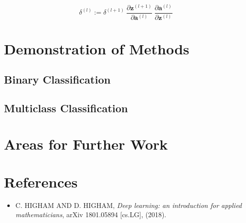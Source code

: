 \documentclass{article}
\begin{document}
        
        
        $$
        \delta^{(l)} :=
            \delta^{(l+1)} \
            \frac{\partial \mathbf{z}^{(l+1)}}{\partial \mathbf{a}^{(l)}} \
            \frac{\partial \mathbf{a}^{(l)}}{\partial \mathbf{z}^{(l)}} \
        $$
        
        
        
        
        
        






\section{Demonstration of Methods}

    \subsection{Binary Classification}
    
    \subsection{Multiclass Classification}
    



\section{Areas for Further Work}    




\section*{References}

	\begin{itemize}
	
		\item[] C. HIGHAM AND D. HIGHAM, \textit{Deep learning: an introduction for applied mathematicians}, arXiv 1801.05894 [cs.LG], (2018).

	\end{itemize}
\end{document}
